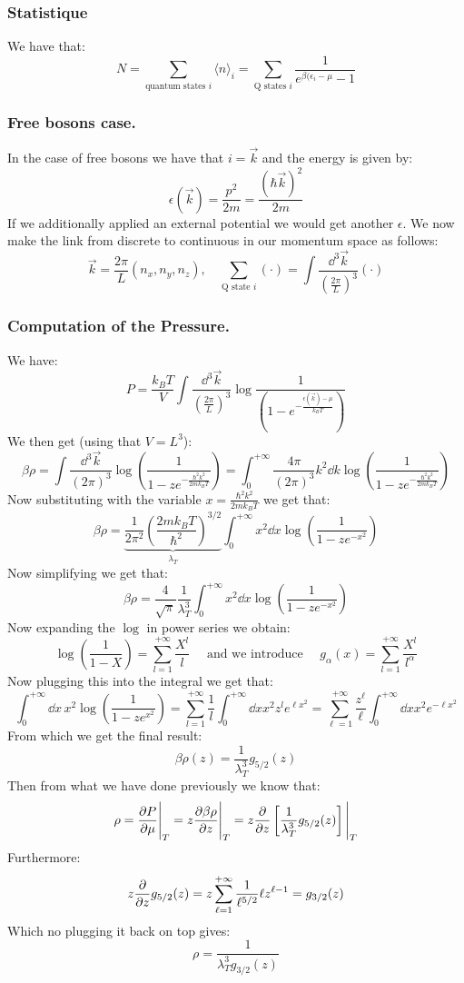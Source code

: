 \documentclass[10pt,a4paper]{book}
\begin{document}
\subsubsection{Statistique}
We have that:
\[
N = \sum_{\text{quantum states }i } \langle n \rangle_i = \sum_{\text{Q states } i} \frac{1}{e^{\beta(\epsilon_i - \mu} - 1}
\]

\subsubsection{Free bosons case.}
In the case of free bosons we have that $i = \vec{k}$ and the energy is given by:
\[
\epsilon(\vec{k}) = \frac{p^2}{2m} = \frac{\left (\hbar \vec{k} \right)^2}{2m}
\]
If we additionally applied an external potential we would get another $\epsilon$. We now make the link from discrete to continuous in our momentum space as follows:
\[
\vec{k} = \frac{2\pi}{L} \left(n_x, n_y, n_z\right), \quad \sum_{\text{Q state } i} \left( \cdot \right) = \int \frac{\dd^3 \vec{k}}{\left( \frac{2\pi}{L} \right)^3} \left( \cdot \right)
\]

\subsubsection{Computation of the Pressure.}
We have:
\[
P = \frac{k_B T }{V}\int \frac{\dd^3 \vec{k}}{\left(\frac{2\pi}{L}\right)^3} \log \frac{1}{\left(1 - e^{- \frac{\epsilon(\vec{k}) - \mu}{k_B T}}\right)}
\]
We then get (using that $V = L^3$):
\[
\beta \rho = \int \frac{\dd^3 \vec{k}}{(2 \pi )^3} \log(\frac{1}{1 - z e^{- \frac{\hbar^2 k^2}{2m k_B T}} }) = \int_0^{+\infty} \frac{4\pi}{(2\pi)^3} k^2 \dd k \log(\frac{1}{1 - z e^{-\frac{\hbar^2 k^2}{2m k_B T}}})
\]
Now substituting with the variable $x = \frac{\hbar^2 k^2}{2m k_B T}$ we get that:
\[
\beta \rho = \underbrace{\frac{1}{2 \pi^2} \left(\frac{2 m k_B T}{\hbar^2}\right)^{3/2}}_{\lambda_T} \int_0^{+\infty} x^2 \dd x \log(\frac{1}{1 - ze^{-x^2}})
\]
Now simplifying we get that:
\[
\beta \rho = \frac{4}{\sqrt{\pi}} \frac{1}{\lambda_T^3} \int_0^{+\infty} x^2 \dd x \log(\frac{1}{1 - z e^{-x^2}})
\]
Now expanding the $\log$ in power series we obtain:
\[
\log(\frac{1}{1 - X}) = \sum_{l = 1}^{+\infty} \frac{X^l}{l} \quad \text{ and we introduce } \quad g_\alpha (x) = \sum_{l = 1}^{+\infty} \frac{X^l}{l^\alpha}
\]
Now plugging this into the integral we get that:
\[
\int_0^{+\infty} \dd x\,  x^2 \log(\frac{1}{1 - ze^{x^2}}) = \sum_{l = 1}^{+\infty} \frac{1}{l} \int_0^{+\infty} \dd{x} x^2 z^l e^{\ell x^2} = \sum_{\ell = 1}^{+\infty} \frac{z^\ell}{\ell} \int_0^{+\infty} \dd{x} x^2 e^{-\ell x^2}
\]
From which we get the final result:
\[
\beta \rho(z) = \frac{1}{\lambda_T^3} g_{5/2}(z)
\]
Then from what we have done previously we know that:
\[
\rho = \pdv{P}{\mu} \Bigg|_T = z \pdv{\beta \rho}{z} \Bigg|_T = z \pdv{}{z}\left[ \frac{1}{\lambda_T^3} g_{5/2}(z) \right] \Bigg|_T 
\]
Furthermore:
\[
z \pdv{}{z} g_{5/2}(z) = z \sum_{\ell = 1}^{+\infty} \frac{1}{\ell^{5/2}} \ell z^{\ell - 1} = g_{3/2}(z)
\]
Which no plugging it back on top gives:
\[
\rho = \frac{1}{\lambda_T^3 g_{3/2}(z)} 
\]
\end{document}
